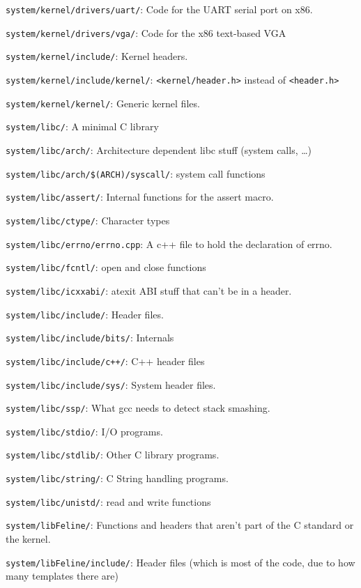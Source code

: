 \documentclass[12pt]{article}
\newcommand{\code}[1]{\colorbox{light-gray}{\texttt{#1}}}
\begin{document}
\begin{list}{}{}
\item \code{system/kernel/drivers/uart/}: Code for the UART serial port on x86.
\item \code{system/kernel/drivers/vga/}: Code for the x86 text-based VGA
\item \code{system/kernel/include/}: Kernel headers.
\item \code{system/kernel/include/kernel/}: \code{<kernel/header.h>} instead of \code{<header.h>}
\item \code{system/kernel/kernel/}: Generic kernel files.
\item \code{system/libc/}: A minimal C library
\item \code{system/libc/arch/}: Architecture dependent libc stuff (system calls, …)
\item \code{system/libc/arch/\$(ARCH)/syscall/}: system call functions
\item \code{system/libc/assert/}: Internal functions for the assert macro.
\item \code{system/libc/ctype/}: Character types
\item \code{system/libc/errno/errno.cpp}: A c++ file to hold the declaration of errno.
\item \code{system/libc/fcntl/}: open and close functions
\item \code{system/libc/icxxabi/}: atexit ABI stuff that can't be in a header.
\item \code{system/libc/include/}: Header files.
\item \code{system/libc/include/bits/}: Internals
\item \code{system/libc/include/c++/}: C++ header files
\item \code{system/libc/include/sys/}: System header files.
\item \code{system/libc/ssp/}: What gcc needs to detect stack smashing.
\item \code{system/libc/stdio/}: I/O programs.
\item \code{system/libc/stdlib/}: Other C library programs.
\item \code{system/libc/string/}: C String handling programs.
\item \code{system/libc/unistd/}: read and write functions
\item \code{system/libFeline/}: Functions and headers that aren't part of the C standard or the kernel.
\item \code{system/libFeline/include/}: Header files (which is most of the code, due to how many templates there are)

\end{list}
\end{document}
